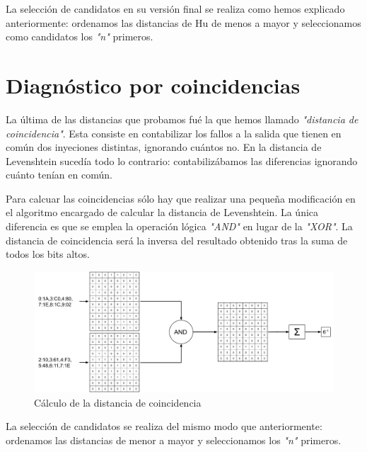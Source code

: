 La selección de candidatos en su versión final se realiza como hemos explicado
anteriormente: ordenamos las distancias de Hu de menos a mayor y seleccionamos
como candidatos los \textit{"n"} primeros.

\section{Diagnóstico por coincidencias}
\label{sec:CoincDist}
La última de las distancias que probamos fué la que hemos llamado
\textit{"distancia de coincidencia"}. Esta consiste en contabilizar los fallos a
la salida que tienen en común dos inyeciones distintas, ignorando cuántos no. En
la distancia de Levenshtein sucedía todo lo contrario: contabilizábamos las
diferencias ignorando cuánto tenían en común. 

Para calcuar las coincidencias sólo hay que realizar una pequeña modificación en
el algoritmo encargado de calcular la distancia de Levenshtein. La única
diferencia es que se emplea la operación lógica \textit{"AND"} en lugar de la
\textit{"XOR"}. La distancia de coincidencia será la inversa del resultado
obtenido tras la suma de todos los bits altos.

\begin{figure}[htbp]
    \centering
    \includegraphics[width=0.95\linewidth]
    {TecnicasDeDiagnosticoAuxiliares/figuras/fig63.pdf}
    \caption{Cálculo de la distancia de coincidencia}
    \label{fig:CoincDist}
\end{figure}

La selección de candidatos se realiza del mismo modo que anteriormente: ordenamos
las distancias de menor a mayor y seleccionamos los \textit{"n"} primeros.


